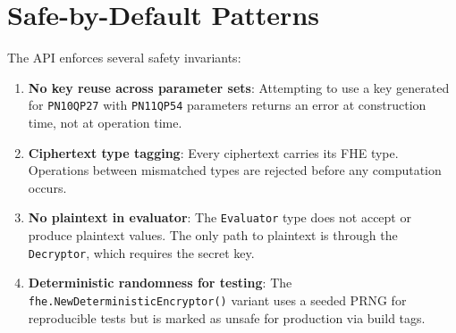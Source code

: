 \section{Safe-by-Default Patterns}


The API enforces several safety invariants:

\begin{enumerate}
\item \textbf{No key reuse across parameter sets}: Attempting to use a key generated for \texttt{PN10QP27} with \texttt{PN11QP54} parameters returns an error at construction time, not at operation time.
\item \textbf{Ciphertext type tagging}: Every ciphertext carries its FHE type. Operations between mismatched types are rejected before any computation occurs.
\item \textbf{No plaintext in evaluator}: The \texttt{Evaluator} type does not accept or produce plaintext values. The only path to plaintext is through the \texttt{Decryptor}, which requires the secret key.
\item \textbf{Deterministic randomness for testing}: The \texttt{fhe.NewDeterministicEncryptor()} variant uses a seeded PRNG for reproducible tests but is marked as unsafe for production via build tags.
\end{enumerate}

